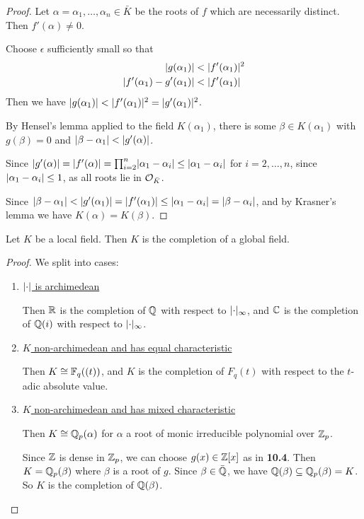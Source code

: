 \documentclass[10pt,a4paper]{article}
\begin{document}
\begin{proof}
  Let $\alpha = \alpha_1, \ldots, \alpha_n \in \bar{K}$ be the roots of $f$ which are necessarily distinct. Then $f'(\alpha) \neq 0$.

  Choose $\epsilon$ sufficiently small so that
  \begin{align*}
    \lvert g(\alpha_1)\rvert &< \lvert f'(\alpha_1)\rvert^2\\
    \lvert f'(\alpha_1)-g'(\alpha_1)\rvert &< \lvert f'(\alpha_1)\rvert
  \end{align*}
  Then we have $\lvert g(\alpha_1)\rvert < \lvert f'(\alpha_1)\rvert^2 = \lvert g'(\alpha_1)\rvert^2$.

  By Hensel's lemma applied to the field $K(\alpha_1)$, there is some $\beta \in K(\alpha_1)$ with $g(\beta) = 0$ and $\lvert\beta-\alpha_1\rvert < \lvert g'(\alpha)\rvert$.

  Since $\lvert g'(\alpha)\rvert = \lvert f'(\alpha)\rvert = \prod_{i=2}^n \lvert\alpha_1-\alpha_i\rvert \leq \lvert\alpha_1-\alpha_i\rvert$ for $i=2, \ldots, n$, since $\lvert\alpha_1-\alpha_i\rvert \leq 1$, as all roots lie in $\mathcal{O}_{\bar{K}}$.

  Since $\lvert\beta-\alpha_1\rvert < \lvert g'(\alpha_1)\rvert = \lvert f'(\alpha_1)\rvert \leq \lvert\alpha_1-\alpha_i\rvert = \lvert\beta-\alpha_i\rvert$, and by Krasner's lemma we have $K(\alpha) = K(\beta)$.
\end{proof}
\begin{theorem}
  Let $K$ be a local field. Then $K$ is the completion of a global field.
\end{theorem}
\begin{proof}
  We split into cases:
  \begin{enumerate}
    \item \underline{$\lvert\cdot\rvert$ is archimedean}

    Then $\mathbb{R}$ is the completion of $\mathbb{Q}$ with respect to $\lvert\cdot\rvert_\infty$, and $\mathbb{C}$ is the completion of $\mathbb{Q}(i)$ with respect to $\lvert\cdot\rvert_\infty$.

    \item \underline{$K$ non-archimedean and has equal characteristic}

    Then $K \cong \mathbb{F}_q((t))$, and $K$ is the completion of $F_q(t)$ with respect to the $t$-adic absolute value.

    \item \underline{$K$ non-archimedean and has mixed characteristic}

    Then $K \cong \mathbb{Q}_p(\alpha)$ for $\alpha$ a root of monic irreducible polynomial over $\mathbb{Z}_p$.

    Since $\mathbb{Z}$ is dense in $\mathbb{Z}_p$, we can choose $g(x) \in \mathbb{Z}[x]$ as in \textbf{10.4}. Then $K = \mathbb{Q}_p(\beta)$ where $\beta$ is a root of $g$. Since $\beta \in \bar{\mathbb{Q}}$, we have $\mathbb{Q}(\beta) \subseteq \mathbb{Q}_p(\beta) = K$. So $K$ is the completion of $\mathbb{Q}(\beta)$.
  \end{enumerate}
\end{proof}
\end{document}
